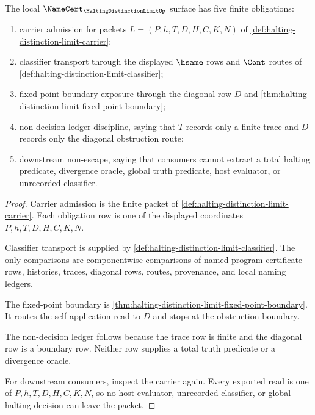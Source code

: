 \begin{theorem}
\label{thm:halting-distinction-limit-namecert-obligations}
The local $\NameCert_{\HaltingDistinctionLimitUp}$ surface has five finite obligations:
\begin{enumerate}
\item carrier admission for packets $L=(P,h,T,D,H,C,K,N)$ of \autoref{def:halting-distinction-limit-carrier};
\item classifier transport through the displayed $\hsame$ rows and $\Cont$ routes of \autoref{def:halting-distinction-limit-classifier};
\item fixed-point boundary exposure through the diagonal row $D$ and \autoref{thm:halting-distinction-limit-fixed-point-boundary};
\item non-decision ledger discipline, saying that $T$ records only a finite trace and $D$ records only the diagonal obstruction route;
\item downstream non-escape, saying that consumers cannot extract a total halting predicate, divergence oracle, global truth predicate, host evaluator, or unrecorded classifier.
\end{enumerate}
\end{theorem}
\begin{proof}
Carrier admission is the finite packet of \autoref{def:halting-distinction-limit-carrier}. Each obligation row is one of the displayed coordinates $P,h,T,D,H,C,K,N$.

Classifier transport is supplied by \autoref{def:halting-distinction-limit-classifier}. The only comparisons are componentwise comparisons of named program-certificate rows, histories, traces, diagonal rows, routes, provenance, and local naming ledgers.

The fixed-point boundary is \autoref{thm:halting-distinction-limit-fixed-point-boundary}. It routes the self-application read to $D$ and stops at the obstruction boundary.

The non-decision ledger follows because the trace row is finite and the diagonal row is a boundary row. Neither row supplies a total truth predicate or a divergence oracle.

For downstream consumers, inspect the carrier again. Every exported read is one of $P,h,T,D,H,C,K,N$, so no host evaluator, unrecorded classifier, or global halting decision can leave the packet.
\end{proof}

